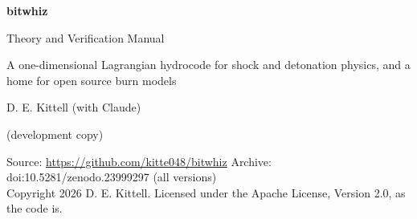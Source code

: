 \documentclass[11pt,oneside]{report}
\numberwithin{equation}{chapter}
\providecommand{\bwversion}{(development copy)}
\begin{document}
\begin{titlepage}
\centering
\vspace*{1.5in}
{\Huge\bfseries\color{slate} \textsf{bitwhiz}\par}
\vspace{10pt}
{\LARGE Theory and Verification Manual\par}
\vspace{24pt}
{\large A one-dimensional Lagrangian hydrocode for shock and detonation
physics, and a home for open source burn models\par}
\vspace{36pt}
{\large D. E. Kittell (with Claude)\par}
\vspace{12pt}
{\normalsize \bwversion\par}
\vfill
{\small
Source: \url{https://github.com/kitte048/bitwhiz}\quad
Archive: doi:10.5281/zenodo.23999297 (all versions)\\[4pt]
Copyright 2026 D. E. Kittell. Licensed under the Apache License,
Version 2.0, as the code is.\par}
\end{titlepage}

\tableofcontents
\clearpage
{}











\appendix






\end{document}
